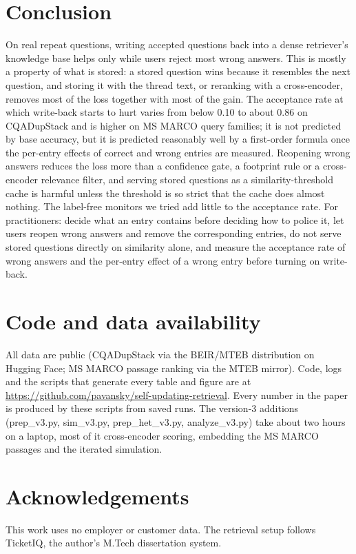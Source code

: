 \documentclass[11pt]{article}
\begin{document}
\section{Conclusion}
On real repeat questions, writing accepted questions back into a dense retriever's knowledge base helps only while users reject most wrong answers. This is mostly a property of what is stored: a stored question wins because it resembles the next question, and storing it with the thread text, or reranking with a cross-encoder, removes most of the loss together with most of the gain. The acceptance rate at which write-back starts to hurt varies from below 0.10 to about 0.86 on CQADupStack and is higher on MS MARCO query families; it is not predicted by base accuracy, but it is predicted reasonably well by a first-order formula once the per-entry effects of correct and wrong entries are measured. Reopening wrong answers reduces the loss more than a confidence gate, a footprint rule or a cross-encoder relevance filter, and serving stored questions as a similarity-threshold cache is harmful unless the threshold is so strict that the cache does almost nothing. The label-free monitors we tried add little to the acceptance rate. For practitioners: decide what an entry contains before deciding how to police it, let users reopen wrong answers and remove the corresponding entries, do not serve stored questions directly on similarity alone, and measure the acceptance rate of wrong answers and the per-entry effect of a wrong entry before turning on write-back.

\section*{Code and data availability}
All data are public (CQADupStack via the BEIR/MTEB distribution on Hugging Face; MS MARCO passage ranking via the MTEB mirror). Code, logs and the scripts that generate every table and figure are at \url{https://github.com/pavansky/self-updating-retrieval}. Every number in the paper is produced by these scripts from saved runs. The version-3 additions (prep\_v3.py, sim\_v3.py, prep\_het\_v3.py, analyze\_v3.py) take about two hours on a laptop, most of it cross-encoder scoring, embedding the MS MARCO passages and the iterated simulation.

\section*{Acknowledgements}
This work uses no employer or customer data. The retrieval setup follows TicketIQ, the author's M.Tech dissertation system.
\end{document}
